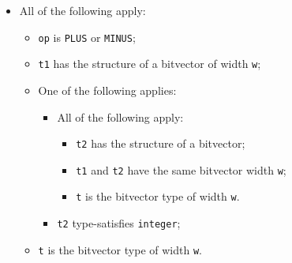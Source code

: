 \documentclass{book}
\begin{document}
\begin{itemize}
  \item All of the following apply:
    \begin{itemize}
    \item \texttt{op} is \texttt{PLUS} or \texttt{MINUS};
    \item \texttt{t1} has the structure of a bitvector of width \texttt{w};
    \item One of the following applies:
      \begin{itemize}
	    \item All of the following apply:
          \begin{itemize}
		    \item \texttt{t2} has the structure of a bitvector;
    		\item \texttt{t1} and \texttt{t2} have the same bitvector width \texttt{w};
    		\item \texttt{t} is the bitvector type of width \texttt{w}.
          \end{itemize}
    	\item \texttt{t2} type-satisfies \texttt{integer};
      \end{itemize}
    \item \texttt{t} is the bitvector type of width \texttt{w}.
    \end{itemize}


\end{itemize}
\end{document}
